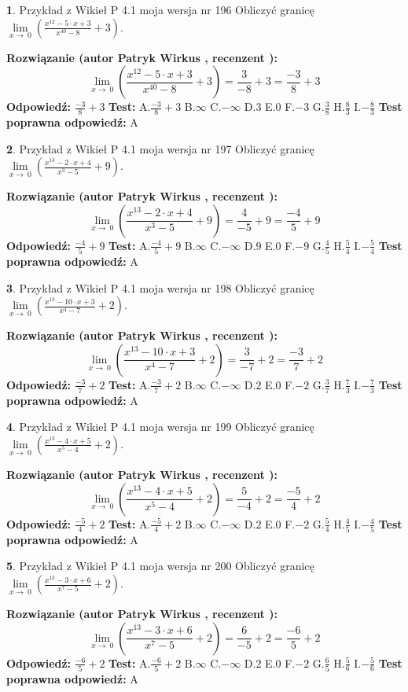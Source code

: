 \documentclass[12pt, a4paper]{article}
\theoremstyle{definition} %
\newtheorem{zad}{}
\newcommand{\zadStart}[1]{\begin{zad}#1\newline}
\newcommand{\zadStop}{\end{zad}}
\newcommand{\rozwStart}[2]{\noindent \textbf{Rozwiązanie (autor #1 , recenzent #2): }\newline}
\newcommand{\rozwStop}{\newline}
\newcommand{\odpStart}{\noindent \textbf{Odpowiedź:}\newline}
\newcommand{\odpStop}{\newline}
\newcommand{\testStart}{\noindent \textbf{Test:}\newline}
\newcommand{\testStop}{\newline}
\newcommand{\kluczStart}{\noindent \textbf{Test poprawna odpowiedź:}\newline}
\newcommand{\kluczStop}{\newline}
\begin{document}
\zadStart{Przykład z Wikieł P 4.1 moja wersja nr 196}
Obliczyć granicę $\lim\limits_{x\to\ 0}(\frac{x^{12}-5 \cdot x +3}{x^{40}-8}+3)$.
\zadStop
\rozwStart{Patryk Wirkus}{}
$$\lim\limits_{x\to\ 0}(\frac{x^{12}-5 \cdot x +3}{x^{40}-8}+3)=\frac{3}{-8}+3=\frac{-3}{8}+3$$
\rozwStop
\odpStart
$\frac{-3}{8}+3$
\odpStop
\testStart
A.$\frac{-3}{8}+3$
B.$\infty$
C.$-\infty$
D.$3$
E.$0$
F.$-3$
G.$\frac{3}{8}$
H.$\frac{8}{3}$
I.$-\frac{8}{3}$
\testStop
\kluczStart
A
\kluczStop



\zadStart{Przykład z Wikieł P 4.1 moja wersja nr 197}
Obliczyć granicę $\lim\limits_{x\to\ 0}(\frac{x^{13}-2 \cdot x +4}{x^{3}-5}+9)$.
\zadStop
\rozwStart{Patryk Wirkus}{}
$$\lim\limits_{x\to\ 0}(\frac{x^{13}-2 \cdot x +4}{x^{3}-5}+9)=\frac{4}{-5}+9=\frac{-4}{5}+9$$
\rozwStop
\odpStart
$\frac{-4}{5}+9$
\odpStop
\testStart
A.$\frac{-4}{5}+9$
B.$\infty$
C.$-\infty$
D.$9$
E.$0$
F.$-9$
G.$\frac{4}{5}$
H.$\frac{5}{4}$
I.$-\frac{5}{4}$
\testStop
\kluczStart
A
\kluczStop



\zadStart{Przykład z Wikieł P 4.1 moja wersja nr 198}
Obliczyć granicę $\lim\limits_{x\to\ 0}(\frac{x^{13}-10 \cdot x +3}{x^{4}-7}+2)$.
\zadStop
\rozwStart{Patryk Wirkus}{}
$$\lim\limits_{x\to\ 0}(\frac{x^{13}-10 \cdot x +3}{x^{4}-7}+2)=\frac{3}{-7}+2=\frac{-3}{7}+2$$
\rozwStop
\odpStart
$\frac{-3}{7}+2$
\odpStop
\testStart
A.$\frac{-3}{7}+2$
B.$\infty$
C.$-\infty$
D.$2$
E.$0$
F.$-2$
G.$\frac{3}{7}$
H.$\frac{7}{3}$
I.$-\frac{7}{3}$
\testStop
\kluczStart
A
\kluczStop



\zadStart{Przykład z Wikieł P 4.1 moja wersja nr 199}
Obliczyć granicę $\lim\limits_{x\to\ 0}(\frac{x^{13}-4 \cdot x +5}{x^{5}-4}+2)$.
\zadStop
\rozwStart{Patryk Wirkus}{}
$$\lim\limits_{x\to\ 0}(\frac{x^{13}-4 \cdot x +5}{x^{5}-4}+2)=\frac{5}{-4}+2=\frac{-5}{4}+2$$
\rozwStop
\odpStart
$\frac{-5}{4}+2$
\odpStop
\testStart
A.$\frac{-5}{4}+2$
B.$\infty$
C.$-\infty$
D.$2$
E.$0$
F.$-2$
G.$\frac{5}{4}$
H.$\frac{4}{5}$
I.$-\frac{4}{5}$
\testStop
\kluczStart
A
\kluczStop



\zadStart{Przykład z Wikieł P 4.1 moja wersja nr 200}
Obliczyć granicę $\lim\limits_{x\to\ 0}(\frac{x^{13}-3 \cdot x +6}{x^{7}-5}+2)$.
\zadStop
\rozwStart{Patryk Wirkus}{}
$$\lim\limits_{x\to\ 0}(\frac{x^{13}-3 \cdot x +6}{x^{7}-5}+2)=\frac{6}{-5}+2=\frac{-6}{5}+2$$
\rozwStop
\odpStart
$\frac{-6}{5}+2$
\odpStop
\testStart
A.$\frac{-6}{5}+2$
B.$\infty$
C.$-\infty$
D.$2$
E.$0$
F.$-2$
G.$\frac{6}{5}$
H.$\frac{5}{6}$
I.$-\frac{5}{6}$
\testStop
\kluczStart
A
\kluczStop
\end{document}

